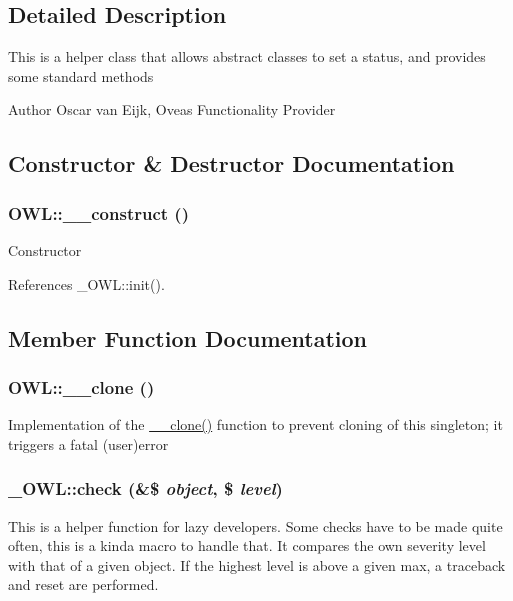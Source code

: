 \subsection{Detailed Description}
This is a helper class that allows abstract classes to set a status, and provides some standard methods \begin{DoxyAuthor}{Author}
Oscar van Eijk, Oveas Functionality Provider 
\end{DoxyAuthor}


\subsection{Constructor \& Destructor Documentation}
\subsubsection[{\_\-\_\-construct}]{\setlength{\rightskip}{0pt plus 5cm}OWL::\_\-\_\-construct ()}\label{classOWL_a9240437570d0787f35b7a1102ee39cc6}
Constructor 

References \_\-OWL::init().



\subsection{Member Function Documentation}
\subsubsection[{\_\-\_\-clone}]{\setlength{\rightskip}{0pt plus 5cm}OWL::\_\-\_\-clone ()}\label{classOWL_a4ab99b467f8f388773f14dd37437bd11}
Implementation of the \hyperlink{classOWL_a4ab99b467f8f388773f14dd37437bd11}{\_\-\_\-clone()} function to prevent cloning of this singleton; it triggers a fatal (user)error 
\subsubsection[{check}]{\setlength{\rightskip}{0pt plus 5cm}\_\-OWL::check (\&\$ {\em object}, \/  \$ {\em level})}\label{class__OWL_ad6f4f6946f40199dd0333cf219fa500e}
This is a helper function for lazy developers. Some checks have to be made quite often, this is a kinda macro to handle that. It compares the own severity level with that of a given object. If the highest level is above a given max, a traceback and reset are performed.


